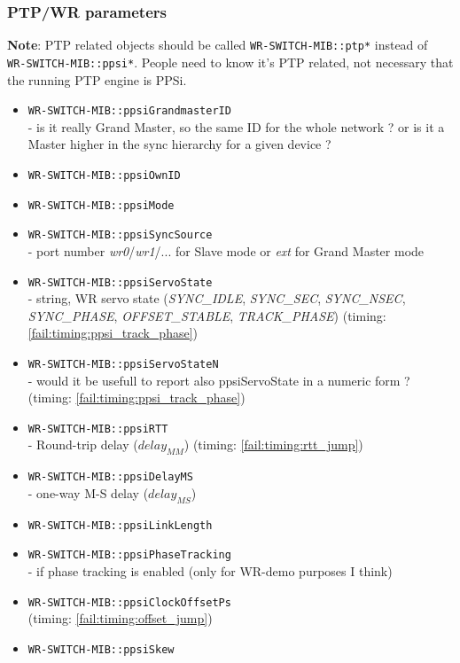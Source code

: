 \subsubsection{PTP/WR parameters}
{\bf Note}: PTP related objects should be called \texttt{WR-SWITCH-MIB::ptp*}
instead of\\
\texttt{WR-SWITCH-MIB::ppsi*}. People need to know it's PTP related,
not necessary that the running PTP engine is PPSi.
\begin{itemize}[leftmargin=0pt]
	\item [] \texttt{WR-SWITCH-MIB::ppsiGrandmasterID}\\ - is it really Grand
		Master, so the same ID for the whole network ? or is it a Master higher in
		the sync hierarchy for a given device ?
	\item [] \texttt{WR-SWITCH-MIB::ppsiOwnID}
	\item [] \texttt{WR-SWITCH-MIB::ppsiMode}
	\item [] \texttt{WR-SWITCH-MIB::ppsiSyncSource}\\ - port number
		\emph{wr0}/\emph{wr1}/... for Slave mode or \emph{ext} for Grand Master mode
	\item [] \texttt{WR-SWITCH-MIB::ppsiServoState}\\ - string, WR servo state
		(\emph{SYNC\_IDLE}, \emph{SYNC\_SEC}, \emph{SYNC\_NSEC}, \emph{SYNC\_PHASE},
		\emph{OFFSET\_STABLE}, \emph{TRACK\_PHASE}) (timing:
		\ref{fail:timing:ppsi_track_phase})
	\item [] \texttt{WR-SWITCH-MIB::ppsiServoStateN}\\ - would it be usefull to
		report also ppsiServoState in a numeric form ? (timing:
		\ref{fail:timing:ppsi_track_phase})
	\item [] \texttt{WR-SWITCH-MIB::ppsiRTT}\\ - Round-trip delay ($delay_{MM}$)
		(timing: \ref{fail:timing:rtt_jump})
	\item [] \texttt{WR-SWITCH-MIB::ppsiDelayMS}\\ - one-way M-S delay
		($delay_{MS}$)
	\item [] \texttt{WR-SWITCH-MIB::ppsiLinkLength}
	\item [] \texttt{WR-SWITCH-MIB::ppsiPhaseTracking}\\ - if phase tracking is
		enabled (only for WR-demo purposes I think)
	\item [] \texttt{WR-SWITCH-MIB::ppsiClockOffsetPs}\\ (timing:
		\ref{fail:timing:offset_jump})
	\item [] \texttt{WR-SWITCH-MIB::ppsiSkew}

\end{itemize}
